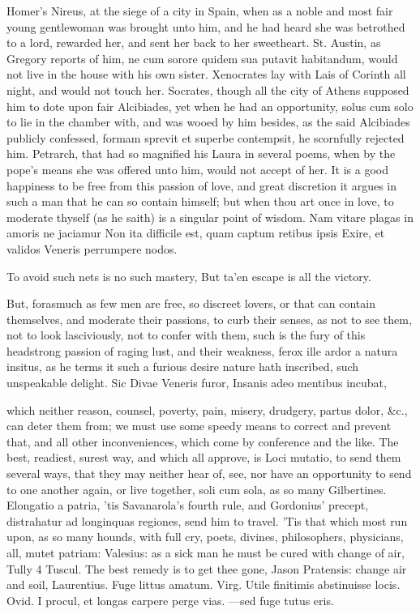 {Homer's Nireus, at the siege of a city in Spain, when as a noble and
most fair young gentlewoman was brought unto him, and he had
heard she was betrothed to a lord, rewarded her, and sent her back to
her sweetheart. St. Austin, as Gregory reports of him, ne cum
sorore quidem sua putavit habitandum, would not live in the house with
his own sister. Xenocrates lay with Lais of Corinth all night, and
would not touch her. Socrates, though all the city of Athens supposed
him to dote upon fair Alcibiades, yet when he had an opportunity,
solus cum solo to lie in the chamber with, and was wooed by him
besides, as the said Alcibiades publicly confessed, formam
sprevit et superbe contempsit, he scornfully rejected him. Petrarch,
that had so magnified his Laura in several poems, when by the pope's
means she was offered unto him, would not accept of her. It is a
good happiness to be free from this passion of love, and great
discretion it argues in such a man that he can so contain himself; but
when thou art once in love, to moderate thyself (as he saith) is a
singular point of wisdom.
Nam vitare plagas in amoris ne jaciamur
Non ita difficile est, quam captum retibus ipsis
Exire, et validos Veneris perrumpere nodos.

To avoid such nets is no such mastery,
But ta'en escape is all the victory.

But, forasmuch as few men are free, so discreet lovers, or that can
contain themselves, and moderate their passions, to curb their senses,
as not to see them, not to look lasciviously, not to confer with them,
such is the fury of this headstrong passion of raging lust, and their
weakness, ferox ille ardor a natura insitus, as he terms it such
a furious desire nature hath inscribed, such unspeakable delight.
Sic Divae Veneris furor,
Insanis adeo mentibus incubat,

which neither reason, counsel, poverty, pain, misery, drudgery, partus
dolor, \&c., can deter them from; we must use some speedy means to
correct and prevent that, and all other inconveniences, which come by
conference and the like. The best, readiest, surest way, and which all
approve, is Loci mutatio, to send them several ways, that they may
neither hear of, see, nor have an opportunity to send to one another
again, or live together, soli cum sola, as so many Gilbertines.
Elongatio a patria, 'tis Savanarola's fourth rule, and Gordonius'
precept, distrahatur ad longinquas regiones, send him to travel. 'Tis
that which most run upon, as so many hounds, with full cry, poets,
divines, philosophers, physicians, all, mutet patriam: Valesius:
as a sick man he must be cured with change of air, Tully 4
Tuscul. The best remedy is to get thee gone, Jason Pratensis: change
air and soil, Laurentius. Fuge littus amatum.
Virg. Utile finitimis abstinuisse locis.
Ovid. I procul, et longas carpere perge vias.
---sed fuge tutus eris.

}
